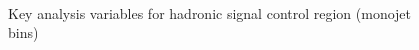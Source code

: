 \begin{figure}
\begin{center}
         \\
        \caption{Key analysis variables for hadronic signal control region (monojet bins)}
        \label{fig:distribution_signal_mono}
    \end{center}
\end{figure}
